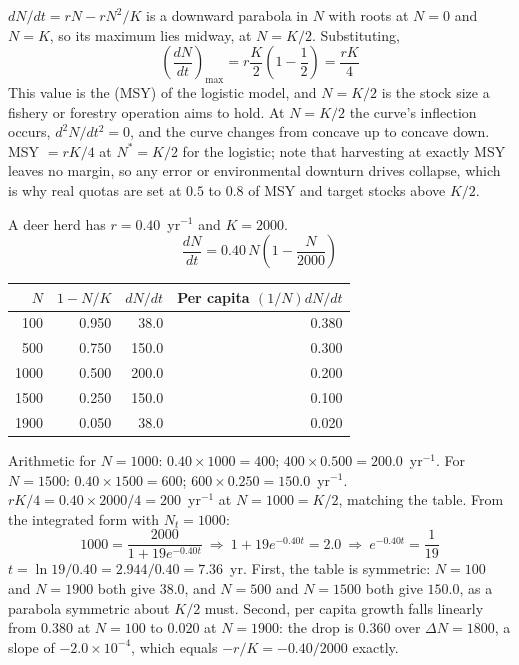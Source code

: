 \begin{thmbox}[title={PRINCIPLE: maximum absolute growth occurs at $N=K/2$}]
$dN/dt=rN-rN^2/K$ is a downward parabola in $N$ with roots at $N=0$ and $N=K$,
so its maximum lies midway, at $N=K/2$. Substituting,
\[
\left(\frac{dN}{dt}\right)_{\max}=r\frac{K}{2}\left(1-\frac{1}{2}\right)
=\frac{rK}{4}
\]
This value is the  (MSY) of the logistic model, and
$N=K/2$ is the stock size a fishery or forestry operation aims to hold. At
$N=K/2$ the curve's inflection occurs, $d^2N/dt^2=0$, and the curve changes from
concave up to concave down.
MSY $=rK/4$ at $N^*=K/2$ for the logistic; note that harvesting at exactly MSY
leaves no margin, so any error or environmental downturn drives collapse, which
is why real quotas are set at $0.5$ to $0.8$ of MSY and target stocks above
$K/2$.
\end{thmbox}

\begin{calcbox}[title={WORKED: logistic growth rates and yield for a deer herd}]
A deer herd has $r=0.40$~yr$^{-1}$ and $K=2000$.
\[
\frac{dN}{dt}=0.40\,N\left(1-\frac{N}{2000}\right)
\]
\begin{tabular}{@{}rrrr@{}}
\toprule
$N$ & $1-N/K$ & $dN/dt$ & Per capita $(1/N)dN/dt$\\
\midrule
100 & 0.950 & 38.0 & 0.380\\
500 & 0.750 & 150.0 & 0.300\\
1000 & 0.500 & 200.0 & 0.200\\
1500 & 0.250 & 150.0 & 0.100\\
1900 & 0.050 & 38.0 & 0.020\\
\bottomrule
\end{tabular}

Arithmetic for $N=1000$: $0.40\times1000=400$; $400\times0.500=200.0$~yr$^{-1}$.
For $N=1500$: $0.40\times1500=600$; $600\times0.250=150.0$~yr$^{-1}$.
 $rK/4=0.40\times2000/4=200$~yr$^{-1}$ at $N=1000=K/2$, matching
the table.
 From the integrated form with
$N_t=1000$:
\[
1000=\frac{2000}{1+19e^{-0.40t}}\ \Rightarrow\ 1+19e^{-0.40t}=2.0
\ \Rightarrow\ e^{-0.40t}=\frac{1}{19}
\]
$t=\ln 19/0.40=2.944/0.40=7.36$~yr.
 First, the table is symmetric: $N=100$ and $N=1900$
both give $38.0$, and $N=500$ and $N=1500$ both give $150.0$, as a parabola
symmetric about $K/2$ must. Second, per capita growth falls linearly from
$0.380$ at $N=100$ to $0.020$ at $N=1900$: the drop is $0.360$ over
$\Delta N=1800$, a slope of $-2.0\times10^{-4}$, which equals
$-r/K=-0.40/2000$ exactly. \tm{$\surd$}
\end{calcbox}

